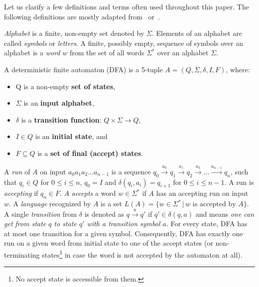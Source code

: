 Let us clarify a few definitions and terms often used throughout this paper. The following definitions are mostly adapted from~\cite{Esparza} or~\cite{Sipser}.

\emph{Alphabet} is a finite, non-empty set denoted by $\Sigma$. Elements of an alphabet are called \emph{symbols} or \emph{letters}. A finite, possibly empty, sequence of symbols over an alphabet is a \emph{word} $w$ from the set of all words $\Sigma^*$ over an alphabet $\Sigma$.

\begin{definition} \hfill \newline
    A deterministic finite automaton (DFA) is a 5-tuple $A = (Q, \Sigma, \delta, I, F)$, where:
    \begin{itemize}
        \item Q is a non-empty \textbf{set of states},
        \item $\Sigma$ is an \textbf{input alphabet},
        \item $\delta$ is a \textbf{transition function}: $Q \times \Sigma \rightarrow{} Q$,
        \item $I \in Q$ is an \textbf{initial state}, and
        \item $F \subseteq Q$ is a \textbf{set of final (accept) states}.
    \end{itemize}
\end{definition}

A \emph{run} of $A$ on input $a_0a_1a_2 \ldots a_{n-1}$ is a sequence $q_0 \xrightarrow{a_0} q_1 \xrightarrow{a_1} q_2 \xrightarrow{a_3} \ldots \xrightarrow{a_{n-1}} q_n$, such that $q_i \in Q$ for $0 \leq i \leq n$, $q_0 = I$ and $\delta(q_i, a_i) = q_{i+1}$ for $0 \leq i \leq n - 1$. A run is \emph{accepting} if $q_n \in F$. $A$ \emph{accepts} a word $w \in \Sigma^*$ if $A$ has an accepting run on input $w$. A \emph{language} recognized by $A$ is a set $L(A) = \{w \in \Sigma^* \,\vert\, w \text{ is accepted by } A\}$. A single \emph{transition} from $\delta$ is denoted as $q \xrightarrow{a} q'$ if $q' \in \delta(q, a)$ and means \textit{one can get from state $q$ to state $q'$ with a transition symbol $a$}. For every state, DFA has at most one transition for a given symbol. Consequently, DFA has exactly one run on a given word from initial state to one of the accept states (or non-terminating states\footnote{No accept state is accessible from them.} in case the word is not accepted by the automaton at all).

